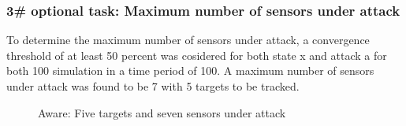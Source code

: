     \subsubsection*{3\# optional task: Maximum number of sensors under attack}
    To determine the maximum number of sensors under attack, a convergence threshold of at least 50 percent was cosidered for both state x and attack a for both 100 simulation in a time period of 100. A maximum number of sensors under attack was found to be 7 with 5 targets to be tracked.
    \begin{figure}[h]   
        \vspace{-1cm}
        \centering 
        \caption{Aware: Five targets and seven sensors under attack}
        \label{fig:aware_4}
    \end{figure}

